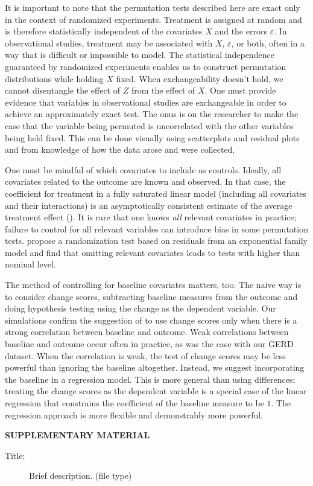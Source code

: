 \documentclass[12pt]{article}
\newcommand{\todo}[1]{{\color{red}{TO DO: \sc #1}}}
\begin{document}
It is important to note that the permutation tests described here are exact only in the context of randomized experiments.
Treatment is assigned at random and is therefore statistically independent of the covariates $X$ and the errors $\varepsilon$.
In observational studies, treatment may be associated with $X$, $\varepsilon$, or both, often in a way that is difficult or impossible to model.
The statistical independence guaranteed by randomized experiments enables us to construct permutation distributions while holding $X$ fixed.
When exchangeability doesn't hold, we cannot disentangle the effect of $Z$ from the effect of $X$.
One must provide evidence that variables in observational studies are exchangeable in order to achieve an approximately exact test.
The onus is on the researcher to make the case that the variable being permuted is uncorrelated with the other variables being held fixed.
This can be done visually using scatterplots and residual plots \cite{freedman_nonstochastic_1983} and from knowledge of how the data arose and were collected.

One must be mindful of which covariates to include as controls.
Ideally, all covariates related to the outcome are known and observed.
In that case, the coefficient for treatment in a fully saturated linear model (including all covariates and their interactions) is an asymptotically consistent estimate of the average treatment effect (\cite{lin_agnostic_2013}).
It is rare that one knows \textit{all} relevant covariates in practice; failure to control for all relevant variables can introduce bias in some permutation tests.
 \cite{gail_tests_1988} propose a randomization test based on residuals from an exponential family model and find that omitting relevant covariates leads to tests with higher than nominal level.
 
The method of controlling for baseline covariates matters, too.
The naive way is to consider change scores, subtracting baseline measures from the outcome and doing hypothesis testing using the change as the dependent variable.
Our simulations confirm the suggestion of \cite{frison_repeated_1992} to use change scores only when there is a strong correlation between baseline and outcome.
Weak correlations between baseline and outcome occur often in practice, as was the case with our GERD dataset.
When the correlation is weak, the test of change scores may be less powerful than ignoring the baseline altogether.
Instead, we suggest incorporating the baseline in a regression model.
This is more general than using differences;
treating the change scores as the dependent variable is a special case of the linear regression that constrains the coefficient of the baseline measure to be $1$.
The regression approach is more flexible and demonstrably more powerful.



\bigskip
\begin{center}
\todo{}
{\large\bf SUPPLEMENTARY MATERIAL}
\end{center}

\begin{description}

\item[Title:] Brief description. (file type)

\end{description}




\end{document}
